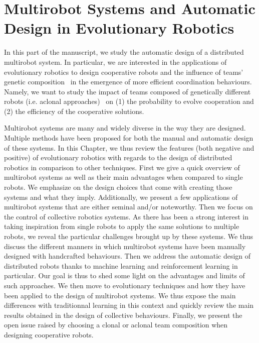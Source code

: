 \chapter{Multirobot Systems and Automatic Design in Evolutionary Robotics}
\label{chapter:design}


\minitoc[n] %

In this part of the manuscript, we study the automatic design of a distributed multirobot system. In particular, we are interested in the applications of evolutionary robotics to design cooperative robots and the influence of teams' genetic composition~\parencite{Waibel2009} in the emergence of more efficient coordination behaviours. Namely, we want to study the impact of teams composed of genetically different robots (i.e. aclonal approaches)~\parencite{Quinn2001} on (1) the probability to evolve cooperation and (2) the efficiency of the cooperative solutions.


Multirobot systems are many and widely diverse in the way they are designed. Multiple methods have been proposed for both the manual and automatic design of these systems. In this Chapter, we thus review the features (both negative and positive) of evolutionary robotics with regards to the design of distributed robotics in comparison to other techniques. First we give a quick overview of multirobot systems as well as their main advantages when compared to single robots. We emphasize on the design choices that come with creating those systems and what they imply. Additionally, we present a few applications of multirobot systems that are either seminal and/or noteworthy. Then we focus on the control of collective robotics systems. As there has been a strong interest in taking inspiration from single robots to apply the same solutions to multiple robots, we reveal the particular challenges brought up by these systems. We thus discuss the different manners in which multirobot systems have been manually designed with handcrafted behaviours. Then we address the automatic design of distributed robots thanks to machine learning and reinforcement learning in particular. Our goal is thus to shed some light on the advantages and limits of such approaches. We then move to evolutionary techniques and how they have been applied to the design of multirobot systems. We thus expose the main differences with traditionnal learning in this context and quickly review the main results obtained in the design of collective behaviours. Finally, we present the open issue raised by choosing a clonal or aclonal team composition when designing cooperative robots.


